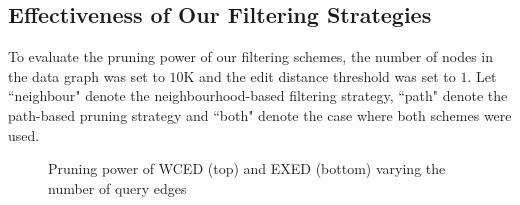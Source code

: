 \documentclass{sigmod}
\begin{document}
\subsection{Effectiveness of Our Filtering Strategies}
\label{sec:filtering}
To evaluate the pruning power of our filtering schemes, the number of nodes in the data graph was set to $10$K and the edit distance threshold was set to $1$. Let ``neighbour" denote the neighbourhood-based filtering strategy, ``path" denote the path-based pruning strategy and ``both" denote the case where both schemes were used.

\begin{figure}[htb]
\setlength{\belowcaptionskip}{-1\baselineskip}
\centering
{}
\vspace{-2\baselineskip}

\vspace{-2\baselineskip}
\caption{Pruning power of WCED (top) and EXED (bottom) varying the number of query edges}
\label{fig:prune}
\end{figure}
\end{document}

